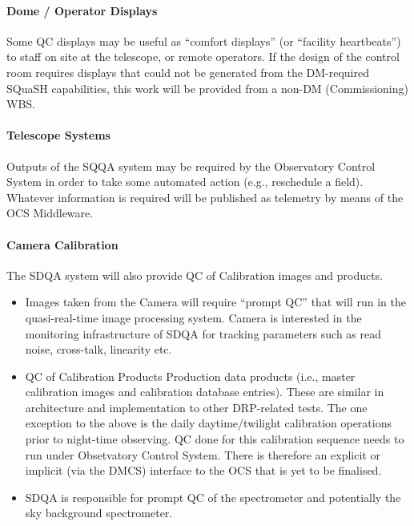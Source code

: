 \paragraph{Dome / Operator Displays}
\label{sec:qaDomeDisplay}

Some QC displays may be useful as ``comfort displays'' (or ``facility heartbeats'') to staff on site at the telescope, or remote operators. If the design of the control room requires displays that could not be generated from the DM-required SQuaSH capabilities, this work will be provided from a non-DM (Commissioning) WBS.

\paragraph{Telescope Systems}
\label{sec:qaTelescopeSystem}

Outputs of the SQQA system may be required by the Observatory Control System in order to take some automated action (e.g., reschedule a field). Whatever information is required will be published as telemetry by means of the OCS Middleware.

\paragraph{Camera Calibration}
\label{sec:qaCameraCalibration}

The SDQA system will also provide QC of Calibration images and products.

\begin{itemize}

\item Images taken from the Camera will require ``prompt QC'' that will run in the quasi-real-time image processing system. Camera is interested in the monitoring infrastructure of SDQA for tracking parameters such as read noise, cross-talk, linearity etc.

\item QC of Calibration Products Production data products (i.e., master calibration images and calibration database entries). These are similar in architecture and implementation to other DRP-related tests. The one exception to the above is the daily daytime/twilight calibration operations prior to night-time observing. QC done for this calibration sequence needs to run under Obsetvatory Control System. There is therefore an explicit or implicit (via the DMCS) interface to the OCS that is yet to be finalised.

\item SDQA is responsible for prompt QC of the spectrometer and potentially the sky background spectrometer.

\end{itemize}

